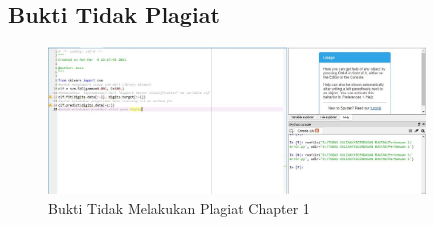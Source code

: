 	\subsection{Bukti Tidak Plagiat}
\begin{figure}[h]
	\includegraphics[width=10cm]{figures/1184013/chapter 1/error.JPG}
	\centering
	\caption{Bukti Tidak Melakukan Plagiat Chapter 1}
\end{figure}